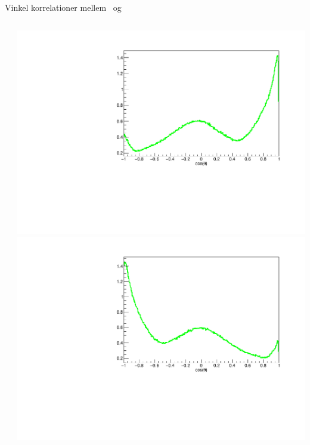 \begin{frame}{Vinkel korrelationer mellem \al\ og \be}
\begin{columns}
	\begin{itemize}
	\end{itemize}
	\begin{overprint}
	\includegraphics[width=\columnwidth]{../figures/justAl1.pdf}
	\onslide<2>\includegraphics[width=\columnwidth]{../figures/justAl2.pdf}

\end{overprint}
\end{columns}
\end{frame}
